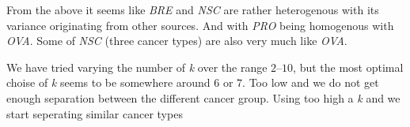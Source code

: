 From the above it seems like \emph{BRE} and \emph{NSC} are rather
heterogenous with its variance originating from other sources. And
with \emph{PRO} being homogenous with \emph{OVA}. Some of \emph{NSC}
(three cancer types) are also very much like \emph{OVA}.

We have tried varying the number of \emph{k} over the range $2$--$10$,
but the most optimal choise of \emph{k} seems to be somewhere around
$6$ or $7$. Too low and we do not get enough separation between the
different cancer group. Using too high a \emph{k} and we start
seperating similar cancer types
